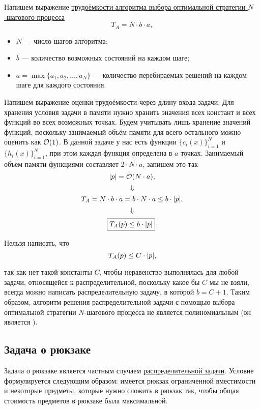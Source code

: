 \prooof

Напишем выражение \hyperref[fact:n_step_complexity]{трудоёмкости алгоритма выбора оптимальной стратегии $N$-шагового процесса}
\[
T_A = N \cdot b \cdot a,
\]

\begin{itemize}[nosep]
	\item $N$ --- число шагов алгоритма;
	
	\item $b$ --- количество возможных состояний на каждом шаге;
	
	\item $a = \max\{a_1, a_2, \dots, a_N\}$ --- количество перебираемых решений на каждом шаге для каждого состояния.
\end{itemize}

Напишем выражение оценки трудоёмкости через длину входа задачи. Для хранения условия задачи в памяти нужно хранить значения всех констант и всех функций во всех возможных точках. Будем учитывать лишь хранение значений функций, поскольку занимаемый объём памяти для всего остального можно оценить как $\mathcal{O}(1)$. В данной задаче у нас есть функции $\{c_i(x)\}_{i=1}^N$ и $\{h_i(x)\}_{i=1}^N$, при этом каждая функция определена в $a$ точках. Занимаемый объём памяти функциями составляет $2 \cdot N \cdot a$, запишем это так
\[
\abs{p} = \mathcal{O}(N \cdot a),
\]
\[
\Downarrow
\]
\[
T_A = N \cdot b \cdot a = b \cdot N \cdot a \le b \cdot \abs{p},
\]
\[
\Downarrow
\]
\[
\boxed{T_A(p) \le b \cdot \abs{p}}.
\]

\remark

Нельзя написать, что
\[
T_A(p) \le C \cdot \abs{p},
\]

так как нет такой константы $C$, чтобы неравенство выполнялась для любой задачи, относящейся к распределительной, поскольку какое бы $C$ мы не взяли, всегда можно написать распределительную задачу, в которой $b = C + 1$. Таким образом, алгоритм решения распределительной задачи с помощью выбора оптимальной стратегии $N$-шагового процесса не является полиномиальным (он является ).

\subsection{Задача о рюкзаке}

\problem[о рюкзаке]

Задача о рюкзаке является частным случаем \hyperref[pr:distribution]{распределительной задачи}. Условие формулируется следующим образом: имеется рюкзак ограниченной вместимости и некоторые предметы, которые нужно сложить в рюкзак так, чтобы общая стоимость предметов в рюкзаке была максимальной. 

